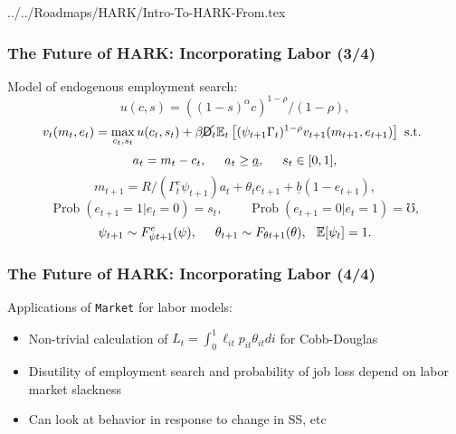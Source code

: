\documentclass[11ptt]{beamer}
\newcommand{\Prob}{\operatorname{Prob}}
\newcommand{\E}{\mathbb{E}}
\newcommand{\bi}{\begin{itemize}}
\newcommand{\ei}{\end{itemize}}
\newcommand{\Die}{\mathsf{D}}
\newcommand{\Live}{\cancel{\Die}}
\begin{document}
\begin{verbatimwrite}{../../Roadmaps/HARK/Intro-To-HARK-From.tex}
\begin{frame}
\frametitle{The Future of HARK: Incorporating Labor (3/4)}
Model of endogenous employment search:
\begin{equation*}
u(c,s) = ((1-s)^\alpha c)^{1-\rho}/(1-\rho),
\end{equation*}
\begin{equation*}
v_t(m_t,e_t) = \max_{c_t,s_t} u(c_t,s_t) + \beta \Live_t \E_t \left[(\psi_{t+1} \Gamma_t)^{1-\rho} v_{t+1}(m_{t+1},e_{t+1}) \right] \text{ s.t. }
\end{equation*}
\begin{equation*}
a_t = m_t - c_t, \hspace{0.5cm} a_t \geq \underline{a}, \hspace{0.5cm} s_t \in [0,1],
\end{equation*}
\begin{equation*}
m_{t+1} = R/(\Gamma^e_t \psi_{t+1}) a_t + \theta_t e_{t+1} + \underline{b}(1-e_{t+1}), 
\end{equation*}
\begin{equation*}
\Prob(e_{t+1} = 1 | e_t = 0) = s_t, \qquad \Prob(e_{t+1} = 0 | e_t = 1) = \mho,
\end{equation*}
\begin{equation*}
\psi_{t+1} \sim F^e_{\psi t+1}(\psi), \hspace{0.5cm} \theta_{t+1} \sim F_{\theta t+1}(\theta), \hspace{0.25cm} \E[\psi_t] = 1.
\end{equation*}
\end{frame}



\begin{frame}
\frametitle{The Future of HARK: Incorporating Labor (4/4)}
Applications of \texttt{Market} for labor models:
\bi
\item Non-trivial calculation of $L_t = \int_0^1 \ell_{it} p_{it} \theta_{it} di$ for Cobb-Douglas

\item Disutility of employment search and probability of job loss depend on labor market slackness

\item Can look at behavior in response to change in SS, etc
\ei

\hyperlink{DiscussionTopics}{}
\end{frame}



\end{verbatimwrite}
\end{document}
